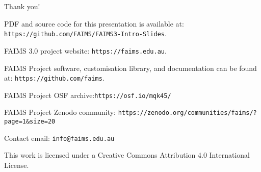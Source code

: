 
\begin{frame}{Thank you!}

PDF and source code for this presentation is available at: 
\texttt{https://github.com/FAIMS/FAIMS3-Intro-Slides}.

\medskip

FAIMS 3.0 project website: \texttt{https://faims.edu.au}.

\medskip

FAIMS Project software, customisation library, and documentation can be found at:
\texttt{https://github.com/faims}.

\medskip

FAIMS Project OSF archive:\texttt{https://osf.io/mqk45/}

\medskip

FAIMS Project Zenodo community: \texttt{https://zenodo.org/communities/faims/?page=1&size=20}

\medskip
Contact email: \texttt{info@faims.edu.au}

\vfill

This work is licensed under a Creative Commons Attribution 4.0 International License.

\end{frame}